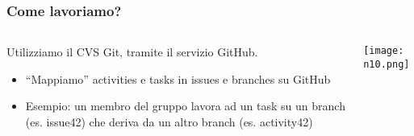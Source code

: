 \begin{frame}
\frametitle{Come lavoriamo?}
\begin{columns}
    \begin{column}{0.4\textwidth}
     \par
	Utilizziamo il CVS Git, tramite il servizio GitHub.\\
	\begin{itemize}
		\item ``Mappiamo'' activities e tasks in issues e branches su GitHub
		\item Esempio: un membro del gruppo lavora ad un task su un branch (es. issue42) che deriva da un altro branch (es. activity42)
	\end{itemize}
    \end{column}
    \begin{column}{0.4\textwidth}
     \texttt{[image: n10.png]}
    \end{column}
  \end{columns}
\end{frame}


